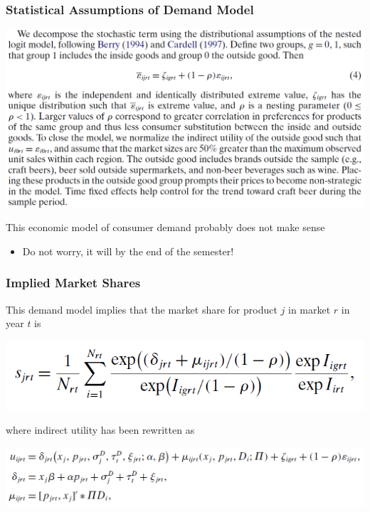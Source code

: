 \documentclass{beamer}
\begin{document}
\begin{frame}\frametitle{Statistical Assumptions of Demand Model}
    \begin{center}
        \includegraphics[width=0.95\linewidth]{eq_4}
    \end{center}
    This economic model of consumer demand probably does not make sense
    \begin{itemize}
        \item Do not worry, it will by the end of the semester!
    \end{itemize}
\end{frame}

\begin{frame}\frametitle{Implied Market Shares}
    This demand model implies that the market share for product $j$ in market $r$ in year $t$ is
    \begin{center}
        \includegraphics[width=0.6\linewidth]{eq_6}
    \end{center}
    where indirect utility has been rewritten as
    \begin{center}
        \includegraphics[width=0.9\linewidth]{eq_5}
    \end{center}
\end{frame}
\end{document}
